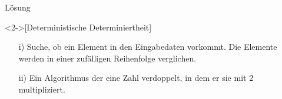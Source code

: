 \begin{frame}[c]{Lösung}
    \begin{solve}<2->[Deterministische Determiniertheit]
        \pause{}\begin{enumerate}[<+(1)->]
            \item[i)] Suche, ob ein Element in den Eingabedaten vorkommt.\pause{} Die Elemente werden in einer zufälligen Reihenfolge verglichen.
            \item[ii)] Ein Algorithmus der eine Zahl verdoppelt, in dem er sie mit \(2\) multipliziert.
        \end{enumerate}
    \end{solve}
\end{frame}
\fi